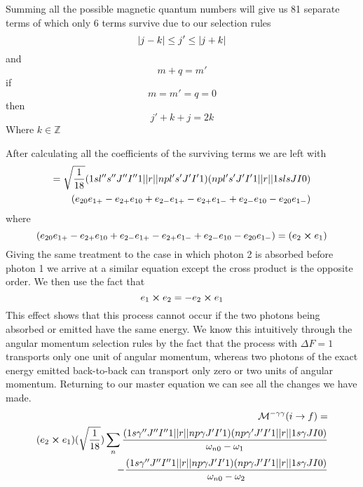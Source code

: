 Summing all the possible magnetic quantum numbers will give us 81 separate terms of which only 6 terms survive due to our selection rules
\begin{equation}
\abs{j-k}\leq j'\leq\abs{j+k}
\end{equation}
and 
\begin{equation}
    m+q=m'
\end{equation}
if
\begin{equation}
  m=m'=q=0  
\end{equation}
then
\begin{equation}
    j'+k+j=2k
\end{equation}
Where \(k\in \mathbb{Z}\)

After calculating all the coefficients of the surviving terms we are left with
\begin{equation}
    \begin{split}
        =\sqrt{\frac{1}{18}
        }(1sl'' s'' J'' I'' 1\abs{\abs{r}}npl's'J'I'1)
        (npl' s' J' I' 1\abs{\abs{r}}1s lsJI0)\\
        (e_{20}e_{1+}-e_{2+}e_{10}+e_{2-}e_{1+}-
        e_{2+}e_{1-}+e_{2-}e_{10}-e_{20}e_{1-})
    \end{split}    
\end{equation}
where
\begin{equation}
    (e_{20}e_{1+}-e_{2+}e_{10}+e_{2-}e_{1+}-
        e_{2+}e_{1-}+e_{2-}e_{10}-e_{20}e_{1-})=(e_2\cross e_1)
\end{equation}
Giving the same treatment to the case in which photon 2 is absorbed before photon 1 we arrive at a similar equation except the cross product is the opposite order. We then use the fact that
\begin{equation}
e_1\cross e_2=-e_2\cross e_1    
\end{equation}
This effect shows that this process cannot occur if the two photons being absorbed or emitted have the same energy. We know this intuitively through the angular momentum selection rules by the fact that the process with $\Delta F=1$ transports only one unit of angular momentum, whereas two photons of the exact energy emitted back-to-back can transport only zero or two units of angular momentum. Returning to our master equation we can see all the changes we have made.
\begin{equation}
\begin{split}
    \mathcal{M}^{-\gamma\gamma}(i\rightarrow f)=\\
    (e_2\cross e_1)(\sqrt{\frac{1}{18}})
    \sum_{n}
    \frac{
    (1s\gamma '' J'' I'' 1\abs{\abs{r}}np\gamma J'I'1)
    (np\gamma ' J' I' 1\abs{\abs{r}}1s \gamma JI0)}
    {\omega_{n0}-\omega_{1}}\\
       -
    \frac{
    (1s\gamma '' J'' I'' 1\abs{\abs{r}}np\gamma J'I'1)
    (np \gamma J' I' 1\abs{\abs{r}}1s \gamma JI0)}
    {\omega_{n0}-\omega_{2}}
    \end{split}
\end{equation}
